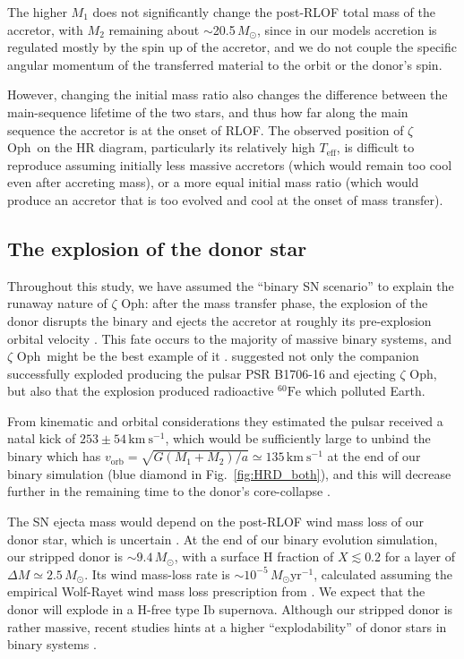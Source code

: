\documentclass[twocolumn,twocolappendix,trackchanges]{aastex63}
\newcommand{\kms}{{\mathrm{km\ s^{-1}}}}
\DeclareRobustCommand{\Figref}[1]{Fig.~\ref{#1}}
\newcommand{\zoph}{$\zeta$ Oph}
\begin{document}
The higher $M_1$ does not significantly change the post-RLOF total
mass of the accretor, with $M_2$ remaining about $\sim$20.5\,$M_\odot$, since
in our models accretion is regulated mostly by the spin up of the
accretor, and we do not couple the specific angular momentum of the transferred
material to the orbit or the donor's spin.

However, changing the initial mass ratio also changes the difference
between the main-sequence lifetime of the two stars, and thus how far
along the main sequence the accretor is at the onset of RLOF. The
observed position of \zoph\ on the HR diagram, particularly its
relatively high $T_\mathrm{eff}$, is difficult to reproduce assuming
initially less massive accretors (which would remain too cool even
after accreting mass), or a more equal initial mass ratio (which would
produce an accretor that is too evolved and cool at the onset of mass
transfer).


\subsection{The explosion of the donor star}
\label{sec:SN_comp}

Throughout this study, we have assumed the ``binary SN scenario'' to
explain the runaway nature of \zoph: after the mass transfer phase,
the explosion of the donor disrupts the binary and ejects the accretor
at roughly its pre-explosion orbital velocity
\citep[e.g.,][]{blaauw:61, eldridge:11, renzo:19walk}. This fate occurs to the
majority of massive binary systems, and \zoph\ might be the best
example of it \citep[e.g.,][]{blaauw:52, blaauw:61,
  hoogerwerf:00}. \cite{neuhauser:20} suggested not only the companion
successfully exploded producing the pulsar PSR B1706-16 and ejecting
\zoph, but also that the explosion produced radioactive
$^{60}\mathrm{Fe}$ which polluted Earth.

From kinematic and orbital considerations they estimated the pulsar
received a natal kick of $253\pm54\,\kms$, which would be sufficiently
large to unbind the binary which has
$v_\mathrm{orb}=\sqrt{G(M_1+M_2)/a}\simeq 135\,\kms$ at the end of our
binary simulation (blue diamond in \Figref{fig:HRD_both}), and this
will decrease further in the remaining time to the donor's
core-collapse \citep{kalogera:96, tauris:98, tauris:15}.

The SN ejecta mass would depend on the post-RLOF wind mass loss of our
donor star, which is uncertain \citep[see also][]{renzo:17, vink:17,
  gilkis:19, sander:20}. At the end of our binary evolution simulation, our
stripped donor is $\sim{}9.4\,M_\odot$, with a surface H fraction of
$X\lesssim0.2$ for a layer of $\Delta M \simeq 2.5\,M_\odot$.  Its
wind mass-loss rate is $\sim10^{-5}\,M_\odot \mathrm{yr^{-1}}$,
calculated assuming the empirical Wolf-Rayet wind mass loss
prescription from \citet[][see also \Figref{fig:MT}]{nugis:00}. We
expect that the donor will explode in a H-free type Ib
supernova. Although our stripped donor is rather massive, recent
studies hints at a higher ``explodability'' of donor stars in binary
systems \citep[e.g.,][]{schneider:21, laplace:21, vartanyan:21}.
\end{document}
